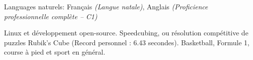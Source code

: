 \documentclass[10pt,a4paper]{article} %
\begin{document}


    \inlineheadsection %
    {Languages naturels:}
    {Français \textit{(Langue natale)}, Anglais \textit{(Proficience professionnelle complète -- C1)}}


    \spacedhrule{1.6em}{-0.4em} %


    {Linux et développement open-source. Speedcubing, ou résolution compétitive de puzzles Rubik's Cube
        (Record personnel : 6.43 secondes). Basketball, Formule 1, course à pied et sport en général.}

\end{document}
